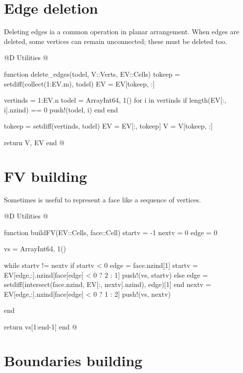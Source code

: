 \section{Edge deletion}
\label{sec:delete_edges}

Deleting edges ia a common operation in planar arrangement. When
edges are deleted, some vertices can remain unconnected; these must be deleted too.

@D Utilities
@{function delete_edges(todel, V::Verts, EV::Cells)
    tokeep = setdiff(collect(1:EV.m), todel)
    EV = EV[tokeep, :]
    
    vertinds = 1:EV.n
    todel = Array{Int64, 1}()
    for i in vertinds
        if length(EV[:, i].nzind) == 0
            push!(todel, i)
        end
    end

    tokeep = setdiff(vertinds, todel)
    EV = EV[:, tokeep]
    V = V[tokeep, :]

    return V, EV
end
@}


\section{FV building}

Sometimes is useful to represent a face like a sequence of vertices.

@D Utilities
@{function buildFV(EV::Cells, face::Cell)
    startv = -1
    nextv = 0
    edge = 0

    vs = Array{Int64, 1}()

    while startv != nextv
        if startv < 0
            edge = face.nzind[1]
            startv = EV[edge,:].nzind[face[edge] < 0 ? 2 : 1]
            push!(vs, startv)
        else
            edge = setdiff(intersect(face.nzind, EV[:, nextv].nzind), edge)[1]
        end
        nextv = EV[edge,:].nzind[face[edge] < 0 ? 1 : 2]
        push!(vs, nextv)

    end

    return vs[1:end-1]
end
@}


\section{Boundaries building}

